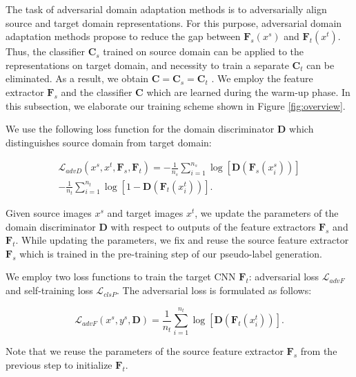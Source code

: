 \documentclass[final]{cvpr}
\begin{document}
The task of adversarial domain adaptation methods is to adversarially align source and target domain representations. For this purpose, adversarial domain adaptation methods propose to reduce the gap between $ \mathbf{F}_s(x^s) $ and $ \mathbf{F}_t(x^t) $. Thus, the classifier $ \mathbf{C}_s $ trained on source domain can be applied to the representations on target domain, and necessity to train a separate $ \mathbf{C}_t $ can be eliminated. As a result, we obtain $ \mathbf{C}=\mathbf{C}_s=\mathbf{C}_t $ \cite{adda}. We employ the feature extractor $ \mathbf{F}_s $ and the classifier $ \mathbf{C} $ which are learned during the warm-up phase. In this subsection, we elaborate our training scheme shown in Figure \ref{fig:overview}.

We use the following loss function for the domain discriminator $ \mathbf{D} $ which distinguishes source domain from target domain:

\begin{equation}
\label{eq:discloss}
    \begin{aligned}
        \mathcal{L}_{advD}(x^s, x^t, \mathbf{F}_s, \mathbf{F}_t) = -\frac{1}{n_s}\sum_{i=1}^{n_s}\log[\mathbf{D}(\mathbf{F}_s(x_i^s))]\\ -\frac{1}{n_t}\sum_{i=1}^{n_t}\log[1-\mathbf{D}(\mathbf{F}_t(x_i^t))].
    \end{aligned}
\end{equation}

Given source images $ x^s $ and target images $ x^t $, we update the parameters of the domain discriminator $ \mathbf{D} $ with respect to outputs of the feature extractors $ \mathbf{F}_s $ and $ \mathbf{F}_t $. While updating the parameters, we fix and reuse the source feature extractor $ \mathbf{F}_s $ which is trained in the pre-training step of our pseudo-label generation.\vspace{2mm}

We employ two loss functions to train the target CNN $ \mathbf{F}_t $: adversarial loss $ \mathcal{L}_{advF} $ and self-training loss $ \mathcal{L}_{clsP} $. The adversarial loss is formulated as follows: 

\begin{equation}
\label{eq:ganobj}
    \mathcal{L}_{advF}(x^s, y^s, \mathbf{D}) = \frac{1}{n_t}\sum_{i=1}^{n_t}\log[\mathbf{D}(\mathbf{F}_t(x_i^t))].
\end{equation}

Note that we reuse the parameters of the source feature extractor $ \mathbf{F}_s $ from the previous step to initialize $ \mathbf{F}_t $.
\vspace{2mm}
\end{document}
